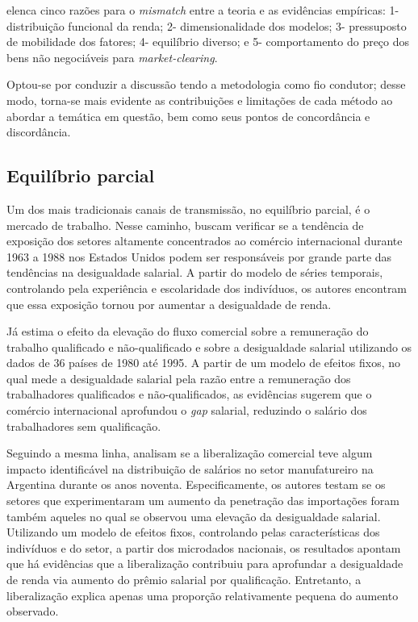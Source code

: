 \textcite{winters02} elenca cinco razões para o \textit{mismatch} entre a teoria e as evidências empíricas: 1- distribuição funcional da renda; 2- dimensionalidade dos modelos; 3- pressuposto de mobilidade dos fatores; 4- equilíbrio diverso; e 5- comportamento do preço dos bens não negociáveis para \textit{market-clearing}.

Optou-se por conduzir a discussão tendo a metodologia como fio condutor; desse modo, torna-se mais evidente as contribuições e limitações de cada método ao abordar a temática em questão, bem como seus pontos de concordância e discordância.


\subsection{Equilíbrio parcial} \label{subsec:eq_parcial}

Um dos mais tradicionais canais de transmissão, no equilíbrio parcial, é o mercado de trabalho. Nesse caminho, \textcite{borjas94} buscam verificar se a tendência de exposição dos setores altamente concentrados ao comércio internacional durante 1963 a 1988 nos Estados Unidos podem ser responsáveis por grande parte das tendências na desigualdade salarial. A partir do modelo de séries temporais, controlando pela experiência e escolaridade dos indivíduos, os autores encontram que essa exposição tornou por aumentar a desigualdade de renda.

Já \textcite{forbes01} estima o efeito da elevação do fluxo comercial sobre a remuneração do trabalho qualificado e não-qualificado e sobre a desigualdade salarial utilizando os dados de 36 países de 1980 até 1995. A partir de um modelo de efeitos fixos, no qual mede a desigualdade salarial pela razão entre a remuneração dos trabalhadores qualificados e não-qualificados, as evidências sugerem que o comércio internacional aprofundou o \textit{gap} salarial, reduzindo o salário dos trabalhadores sem qualificação.

Seguindo a mesma linha, \textcite{galianisanguinetti03} analisam se a liberalização comercial teve algum impacto identificável na distribuição de salários no setor manufatureiro na Argentina durante os anos noventa. Especificamente, os autores testam se os setores que experimentaram um aumento da penetração das importações foram também aqueles no qual se observou uma elevação da desigualdade salarial. Utilizando um modelo de efeitos fixos, controlando pelas características dos indivíduos e do setor, a partir dos microdados nacionais, os resultados apontam que há evidências que a liberalização contribuiu para aprofundar a desigualdade de renda via aumento do prêmio salarial por qualificação. Entretanto, a liberalização explica apenas uma proporção relativamente pequena do aumento observado.


